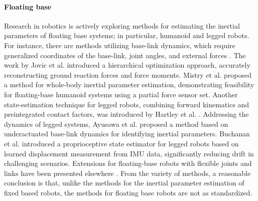 \paragraph*{Floating base} Research in robotics is actively exploring methods for estimating the inertial parameters of floating base systems; in particular, humanoid and legged robots. For instance, there are methods utilizing base-link dynamics, which require generalized coordinates of the base-link, joint angles, and external forces \cite{Ayusawa2008Identificationhumanoidrobots, Ayusawa2008Identificationinertialparameters, Ayusawa2009MinimalsetInertial, Iwasaki2012Identificationinertialparameters}. The work by Jovic et al. \cite{Jovic2016HumanoidHumanInertia} introduced a hierarchical optimization approach, accurately reconstructing ground reaction forces and force moments. Mistry et al. \cite{Mistry2009Inertialparameterestimation} proposed a method for whole-body inertial parameter estimation, demonstrating feasibility for floating-base humanoid systems using a partial force sensor set. Another state-estimation technique for legged robots, combining forward kinematics and preintegrated contact factors, was introduced by Hartley et al. \cite{Hartley2018LeggedRobotState}. Addressing the dynamics of legged systems, Ayusawa et al. \cite{Ayusawa2014Identifiabilityidentificationinertial} proposed a method based on underactuated base-link dynamics for identifying inertial parameters. Buchanan et al. \cite{RussellBuchanan2021LearningInertialOdometry} introduced a proprioceptive state estimator for legged robots based on learned displacement measurement from IMU data, significantly reducing drift in challenging scenarios. Extensions for floating-base robots with flexible joints and links have been presented elsewhere \cite{Khalil2017GeneralDynamicAlgorithm}. From the variety of methods, a reasonable conclusion is that, unlike the methods for the inertial parameter estimation of fixed based robots, the methods for floating base robots are not as standardized.


